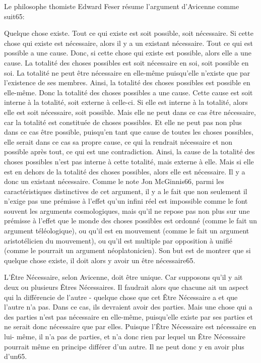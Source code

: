 Le philosophe thomiste Edward Feser résume l'argument d’Avicenne comme suit65:

Quelque chose existe.
Tout ce qui existe est soit possible, soit nécessaire.
Si cette chose qui existe est nécessaire, alors il y a un existant nécessaire.
Tout ce qui est possible a une cause.
Donc, si cette chose qui existe est possible, alors elle a une cause.
La totalité des choses possibles est soit nécessaire en soi, soit possible en soi.
La totalité ne peut être nécessaire en elle-même puisqu'elle n'existe que par l'existence de ses membres.
Ainsi, la totalité des choses possibles est possible en elle-même.
Donc la totalité des choses possibles a une cause.
Cette cause est soit interne à la totalité, soit externe à celle-ci.
Si elle est interne à la totalité, alors elle est soit nécessaire, soit possible.
Mais elle ne peut dans ce cas être nécessaire, car la totalité est constituée de choses possibles.
Et elle ne peut pas non plus dans ce cas être possible, puisqu'en tant que cause de toutes les choses possibles, elle serait dans ce cas sa propre cause, ce qui la rendrait nécessaire et non possible après tout, ce qui est une contradiction.
Ainsi, la cause de la totalité des choses possibles n'est pas interne à cette totalité, mais externe à elle.
Mais si elle est en dehors de la totalité des choses possibles, alors elle est nécessaire.
Il y a donc un existant nécessaire.
Comme le note Jon McGinnis66, parmi les caractéristiques distinctives de cet argument, il y a le fait que non seulement il n'exige pas une prémisse à l'effet qu'un infini réel est impossible comme le font souvent les arguments cosmologiques, mais qu'il ne repose pas non plus sur une prémisse à l'effet que le monde des choses possibles est ordonné (comme le fait un argument téléologique), ou qu'il est en mouvement (comme le fait un argument aristotélicien du mouvement), ou qu'il est multiple par opposition à unifié (comme le pourrait un argument néoplatonicien). Son but est de montrer que si quelque chose existe, il doit alors y avoir un être nécessaire65.

L’Être Nécessaire, selon Avicenne, doit être unique. Car supposons qu'il y ait deux ou plusieurs Êtres Nécessaires. Il faudrait alors que chacune ait un aspect qui la différencie de l'autre - quelque chose que cet Être Nécessaire a et que l'autre n'a pas. Dans ce cas, ils devraient avoir des parties. Mais une chose qui a des parties n'est pas nécessaire en elle-même, puisqu'elle existe par ses parties et ne serait donc nécessaire que par elles. Puisque l'Être Nécessaire est nécessaire en lui- même, il n'a pas de parties, et n'a donc rien par lequel un Être Nécessaire pourrait même en principe différer d'un autre. Il ne peut donc y en avoir plus d'un65.

